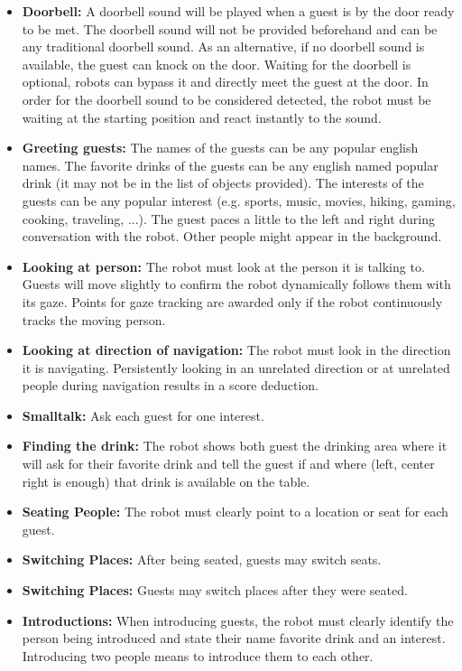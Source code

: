 \begin{itemize}

	\item \textbf{Doorbell:} A doorbell sound will be played when a guest is by the door ready to be met. The doorbell sound will not be provided beforehand and can be any traditional doorbell sound. As an alternative, if no doorbell sound is available, the guest can knock on the door. Waiting for the doorbell is optional, robots can bypass it and directly meet the guest at the door. In order for the doorbell sound to be considered detected, the robot must be waiting at the starting position and react instantly to the sound.
	
	\item \textbf{Greeting guests:} The names of the guests can be any popular english names. The favorite drinks of the guests can be any english named popular drink (it may not be in the list of objects provided). The interests of the guests can be any popular interest (e.g. sports, music, movies, hiking, gaming, cooking, traveling, ...).
	The guest paces a little to the left and right during conversation with the robot. Other people might appear in the background. 
	
	\item \textbf{Looking at person:} The robot must look at the person it is talking to. Guests will move slightly to confirm the robot dynamically follows them with its gaze. Points for gaze tracking are awarded only if the robot continuously tracks the moving person.
	
	\item \textbf{Looking at direction of navigation:} The robot must look in the direction it is navigating. Persistently looking in an unrelated direction or at unrelated people during navigation results in a score deduction.
    
    \item \textbf{Smalltalk:} Ask each guest for one interest.
    
    \item \textbf{Finding the drink:} The robot shows both guest the drinking area where it will ask for their favorite drink and tell the guest if and where (left, center right is enough) that drink is available on the table. 
	
	\item \textbf{Seating People:} The robot must clearly point to a location or seat for each guest.

	\item \textbf{Switching Places:} After being seated, guests may switch seats.
	
	\item \textbf{Switching Places:} Guests may switch places after they were seated.
	
	\item \textbf{Introductions:} When introducing guests, the robot must clearly identify the person being introduced and state their name favorite drink and an interest. Introducing two people means to introduce them to each other.
\end{itemize}

